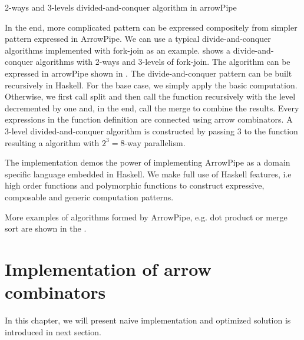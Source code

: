 \begin{listing}[ht]
    \inputminted{Haskell}{arrow/dq.hs}
    \caption{2-ways and 3-levels divided-and-conquer algorithm in arrowPipe}
    \label{arrowPipe:dq}
\end{listing}
In the end, more complicated pattern can be expressed compositely from simpler pattern expressed in ArrowPipe. We can use a typical divide-and-conquer algorithms implemented with fork-join as an example.  shows a divide-and-conquer algorithms with 2-ways and 3-levels of fork-join. The algorithm can be expressed in arrowPipe shown in . The divide-and-conquer pattern can be built recursively in Haskell. For the base case, we simply apply the basic computation. Otherwise, we first call split and then call the function recursively with the level decremented by one and, in the end, call the merge to combine the results. Every expressions in the function definition are connected using arrow combinators. A 3-level divided-and-conquer algorithm is constructed by passing 3 to the function resulting a algorithm with $2^3 = 8$-way parallelism.

The implementation demos the power of implementing ArrowPipe as a domain specific language embedded in Haskell. We make full use of Haskell features, i.e high order functions and polymorphic functions to construct expressive, composable and generic computation patterns.

More examples of algorithms formed by ArrowPipe, e.g. dot product or merge sort are shown in the .
\section{Implementation of arrow combinators} \label{arrowPipe:impl}
In this chapter, we will present naive implementation and optimized solution is introduced in next section.

